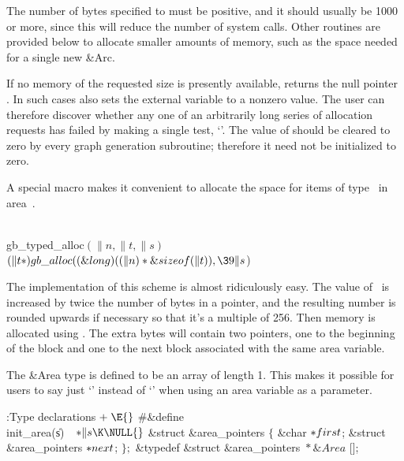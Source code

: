 The number of bytes  specified to  must be positive,
and
it should usually be 1000 or more, since this will reduce the number
of system calls. Other routines are provided below to allocate smaller
amounts of memory, such as the space needed for a single new \&{Arc}.

If no memory of the requested size is presently available, 
returns the null pointer \PB{$\NULL$}. In such cases  also
sets
the external variable  to a nonzero value. The user
can therefore discover whether any one of an arbitrarily long series
of allocation requests has failed by making a single test, `'. The value of  should be cleared
to zero
by every graph generation subroutine; therefore it need not be
initialized to zero.

A special macro  makes it convenient to
allocate
the space for  items of type~ in area~.

\Y\B\4\D\\{gb\_typed\_alloc}$(\|n,\|t,\|s)$\5
$(\|t*)\\{gb\_alloc}((\&{long})((\|n)*\&{sizeof}(\|t)),\39\|s{}$)\par
\fi

The implementation of this scheme is almost ridiculously easy. The
value of~ is increased by twice the number of bytes in a pointer,
and the resulting number is rounded upwards if necessary so that it's
a multiple of 256. Then memory is allocated using .  The extra
bytes will contain two pointers, one to the beginning of the block and
one to the next block associated with the same area variable.

The \&{Area} type is defined to be an array of length 1. This makes it possible
for users to say just `' instead of `' when using an
area
variable as a parameter.

\Y\B\4:Type declarations\X${}\mathrel+\E{}$\6
\8\#\&{define} \\{init\_area}(\|s)\5${}\hbox{\quad}{*}\|s\K\NULL{}$\6
\&{struct} \&{area\_pointers} ${}\{{}$\1\6
\&{char} ${}{*}\\{first}{}$;\6
\&{struct} \&{area\_pointers} ${}{*}\\{next}{}$;\2\6
${}\};{}$\6
\&{typedef} \&{struct} \&{area\_pointers} ${}{*}\&{Area}{}$ [];\par
\fi

